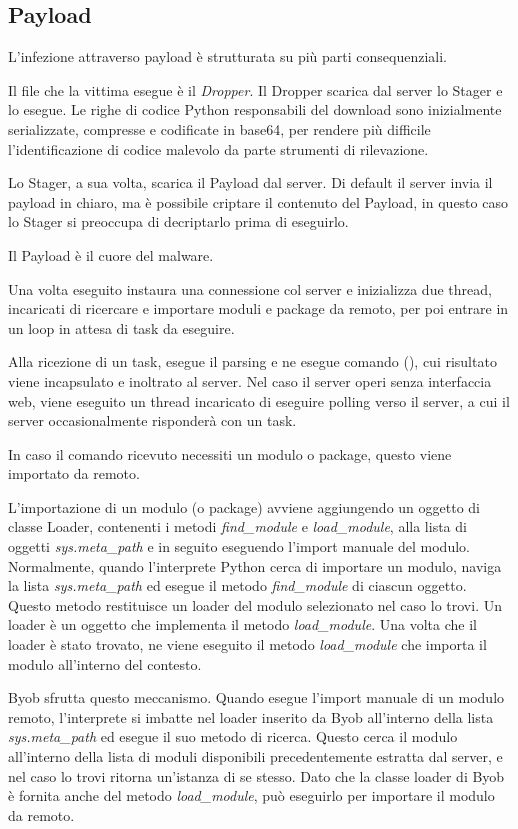 \subsection{Payload}

L'infezione attraverso payload è strutturata su più parti consequenziali.

Il file che la vittima esegue è il \textit{Dropper}.
Il Dropper scarica dal server lo Stager e lo esegue. Le righe di codice Python responsabili del download sono inizialmente serializzate, compresse e codificate in base64, per rendere più difficile l'identificazione di codice malevolo da parte strumenti di rilevazione.

Lo Stager, a sua volta, scarica il Payload dal server.  Di default il server invia il payload in chiaro, ma è possibile criptare il contenuto del Payload, in questo caso lo Stager si preoccupa di decriptarlo prima di eseguirlo.

Il Payload è il cuore del malware.

Una volta eseguito instaura una connessione col server e inizializza due thread, incaricati di ricercare e importare  moduli e package da remoto, per poi entrare in un loop in attesa di task da eseguire.

Alla ricezione di un task,  esegue il parsing e ne esegue comando (), cui  risultato viene incapsulato e inoltrato al server.
Nel caso il server operi  senza interfaccia web, viene eseguito un thread incaricato di eseguire polling verso il server, a cui il server occasionalmente risponderà con un task.

In caso il comando ricevuto necessiti  un modulo o package, questo viene importato da remoto.

L'importazione di un modulo (o package) avviene aggiungendo un oggetto di classe Loader, contenenti i metodi \textit{find\_module} e \textit{load\_module}, alla lista di oggetti \textit{sys.meta\_path} e in seguito eseguendo l'import manuale del modulo. 
Normalmente, quando l'interprete Python cerca di importare un modulo, naviga la lista \textit{sys.meta\_path} ed esegue il metodo \textit{find\_module} di ciascun oggetto. Questo metodo restituisce un loader del modulo selezionato nel caso lo trovi. Un loader è un oggetto che implementa il metodo \textit{load\_module}.
Una volta che il loader è stato trovato, ne viene eseguito il metodo \textit{load\_module} che importa il modulo all'interno del contesto.

Byob sfrutta questo meccanismo. Quando esegue l'import manuale di un modulo remoto, l'interprete si imbatte nel loader inserito da Byob all'interno della lista \textit{sys.meta\_path} ed esegue il suo metodo di ricerca. Questo cerca il modulo all'interno della lista di moduli disponibili precedentemente estratta dal server, e nel caso lo trovi ritorna un'istanza di se stesso. Dato che la classe loader di Byob è fornita anche del metodo \textit{load\_module}, può eseguirlo per importare il modulo da remoto.


